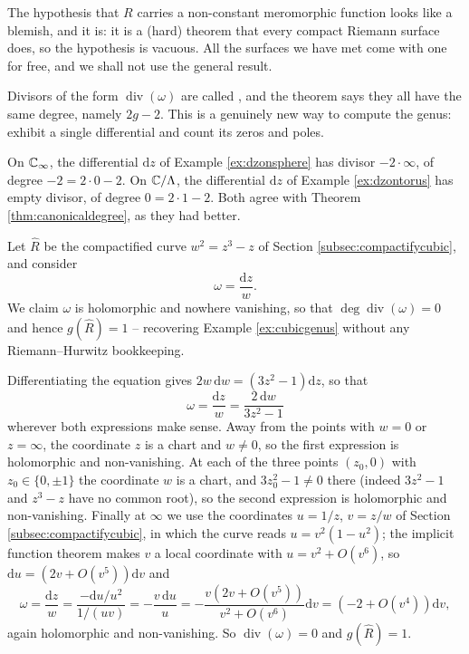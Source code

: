 \documentclass[a4paper]{scrartcl}
\newcommand{\Cinf}{\C_\infty}
\newcommand{\Div}{\operatorname{div}}
\begin{document}
\begin{remark}
	The hypothesis that $R$ carries a non-constant meromorphic function looks like a
	blemish, and it is: it is a (hard) theorem that every compact Riemann surface does, so
	the hypothesis is vacuous. All the surfaces we have met come with one for free, and we
	shall not use the general result.
\end{remark}

Divisors of the form $\Div(\omega)$ are called , and the theorem
says they all have the same degree, namely $2g-2$. This is a genuinely new way to compute
the genus: exhibit a single differential and count its zeros and poles.

\begin{example}
	On $\Cinf$, the differential $\mathrm{d}z$ of Example \ref{ex:dzonsphere} has divisor
	$-2\cdot\infty$, of degree $-2 = 2\cdot 0 - 2$. On $\mathbb{C}/\Lambda$, the differential
	$\mathrm{d}z$ of Example \ref{ex:dzontorus} has empty divisor, of degree $0 = 2\cdot 1 - 2$.
	Both agree with Theorem \ref{thm:canonicaldegree}, as they had better.
\end{example}

\begin{example}
	Let $\hat R$ be the compactified curve $w^2 = z^3-z$ of Section
	\ref{subsec:compactifycubic}, and consider
	$$
	\omega = \frac{\mathrm{d}z}{w}.
	$$
	We claim $\omega$ is holomorphic and nowhere vanishing, so that
	$\deg\Div(\omega) = 0$ and hence $g(\hat R) = 1$ -- recovering Example
	\ref{ex:cubicgenus} without any Riemann--Hurwitz bookkeeping.

	Differentiating the equation gives $2w\,\mathrm{d}w = (3z^2-1)\mathrm{d}z$, so that
	$$
	\omega = \frac{\mathrm{d}z}{w} = \frac{2\,\mathrm{d}w}{3z^2-1}
	$$
	wherever both expressions make sense. Away from the points with $w = 0$ or
	$z = \infty$, the coordinate $z$ is a chart and $w \neq 0$, so the first expression is
	holomorphic and non-vanishing. At each of the three points $(z_0,0)$ with
	$z_0 \in \{0,\pm1\}$ the coordinate $w$ is a chart, and $3z_0^2 - 1 \neq 0$ there
	(indeed $3z^2-1$ and $z^3-z$ have no common root), so the second expression is
	holomorphic and non-vanishing. Finally at $\infty$ we use the coordinates
	$u = 1/z$, $v = z/w$ of Section \ref{subsec:compactifycubic}, in which the curve reads
	$u = v^2(1-u^2)$; the implicit function theorem makes $v$ a local coordinate with
	$u = v^2 + O(v^6)$, so $\mathrm{d}u = (2v + O(v^5))\mathrm{d}v$ and
	$$
	\omega = \frac{\mathrm{d}z}{w} = \frac{-\mathrm{d}u/u^2}{1/(uv)}
	= -\frac{v\,\mathrm{d}u}{u} = -\frac{v(2v+O(v^5))}{v^2 + O(v^6)}\mathrm{d}v
	= \left(-2 + O(v^4)\right)\mathrm{d}v,
	$$
	again holomorphic and non-vanishing. So $\Div(\omega) = 0$ and $g(\hat R) = 1$.
\end{example}
\end{document}
